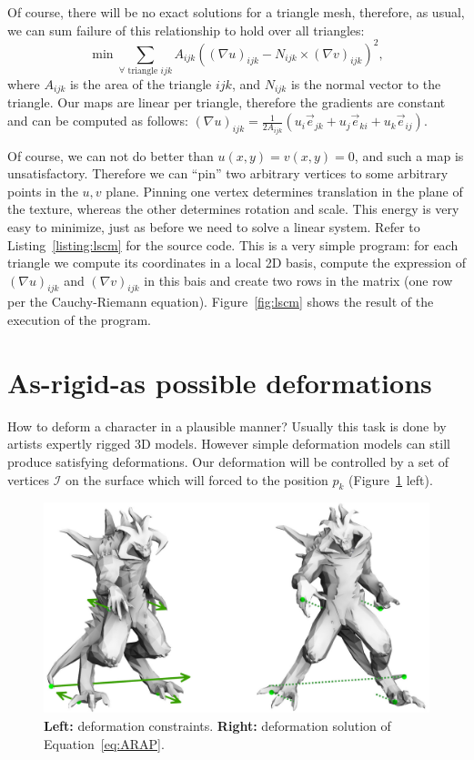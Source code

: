 \documentclass[notitlepage,oneside]{book}
\begin{document}
Of course, there will be no exact solutions for a triangle mesh, therefore, as usual, we can sum failure of this relationship to hold over all triangles:
$$\min \sum\limits_{\forall\text{~triangle~} ijk} A_{ijk}\left((\nabla u)_{ijk} - N_{ijk}\times(\nabla v)_{ijk}\right)^2,$$
where $A_{ijk}$ is the area of the triangle $ijk$, and $N_{ijk}$ is the normal vector to the triangle. Our maps are linear per triangle, therefore the gradients are constant and can be computed as follows:
$(\nabla u)_{ijk} = \frac{1}{2 A_{ijk}}(u_i \vec{e}_{jk} + u_j\vec{e}_{ki} + u_k\vec{e}_{ij})$.

Of course, we can not do better than $u(x,y)=v(x,y)=0$, and such a map is unsatisfactory. Therefore we can ``pin'' two arbitrary vertices to some arbitrary points in the $u,v$ plane.
Pinning one vertex determines translation in the plane of the texture, whereas the other determines rotation and scale.
This energy is very easy to minimize, just as before we need to solve a linear system.
Refer to Listing~\ref{listing:lscm} for the source code.
This is a very simple program: for each triangle we compute its coordinates in a local 2D basis, compute the expression of $(\nabla u)_{ijk}$ and $(\nabla v)_{ijk}$ in this bais
and create two rows in the matrix (one row per the Cauchy-Riemann equation).
Figure~\ref{fig:lscm} shows the result of the execution of the program.


\section{As-rigid-as possible deformations}
\label{sec:arap}
How to deform a character in a plausible manner?
Usually this task is done by artists expertly rigged 3D models.
However simple deformation models can still produce satisfying deformations.
Our deformation will be controlled by a set of vertices $\mathcal{I}$ on the surface which will forced to the position $p_k$ (Figure~\ref{fig:ARAP} left).

\begin{figure}[!h]
 \centering
 \includegraphics[width=\linewidth]{ARAP.jpg}
 \caption{\textbf{Left:} deformation constraints. \textbf{Right:} deformation solution of Equation~\eqref{eq:ARAP}.}
 \label{fig:ARAP}
\end{figure}
\end{document}
